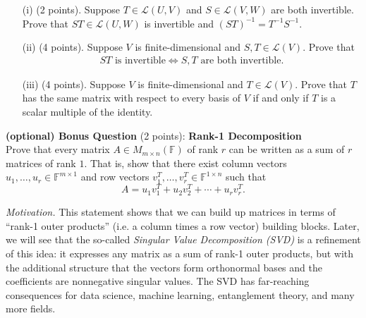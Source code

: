 \documentclass[11pt,letterpaper]{article}
\begin{document}
\begin{enumerate}
    \item[(i)] (2 points). Suppose $T \in \mathcal{L}(U,V)$ and  $S \in \mathcal{L}(V,W)$ are both invertible. Prove that $ST \in \mathcal{L}(U,W)$ is invertible and $(ST)^{-1} = T^{-1} S^{-1}$.
     \item[(ii)] (4 points). Suppose $V$ is finite-dimensional and $S,T \in \mathcal{L}(V).$ Prove that
     \begin{align*}
         ST \text{ is invertible} \Leftrightarrow S,T \text{ are both invertible}.
     \end{align*}
     \item[(iii)] (4 points). Suppose $V$ is finite-dimensional and $T \in \mathcal{L}(V)$. Prove that $T$ has the same matrix with respect to every basis of $V$ if and only if $T$ is a scalar multiple of the identity.
    \end{enumerate}


\textbf{(optional) Bonus Question} (2 points): \textbf{Rank-1 Decomposition}\\

Prove that every matrix $A \in M_{m \times n}(\mathbb{F})$ of rank $r$ can be written as a sum of $r$ matrices of rank $1$. 
That is, show that there exist column vectors $u_1, \dots, u_r \in \mathbb{F}^{m \times 1}$ and row vectors $v_1^T, \dots, v_r^T \in \mathbb{F}^{1 \times n}$ such that
\[
A = u_1 v_1^T + u_2 v_2^T + \cdots + u_r v_r^T.
\]

\textit{Motivation.} This statement shows that we can build up matrices in terms of ``rank-1 outer products'' (i.e. a column times a row vector) building blocks. Later, we will see that the so-called \textit{Singular Value Decomposition (SVD)} is a refinement of this idea: it expresses any matrix as a sum of rank-1 outer products, but with the additional structure that the vectors form orthonormal bases and the coefficients are nonnegative singular values. The SVD has far-reaching consequences for data science, machine learning, entanglement theory, and many more fields. 
\end{document}
